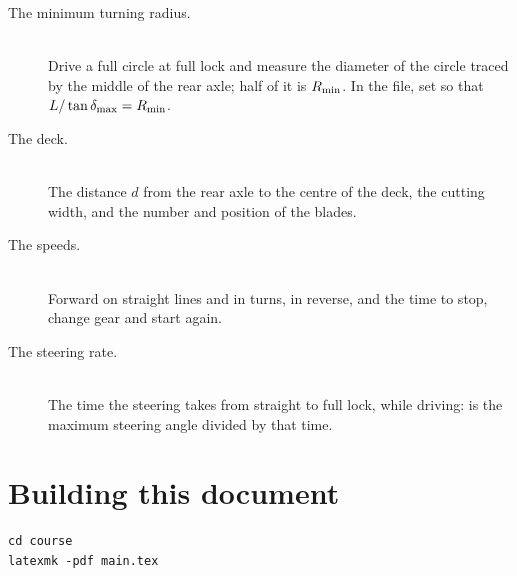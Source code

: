 \begin{description}
  \item[The minimum turning radius.]
    \leavevmode\\
    Drive a full circle at full lock and measure the diameter of the circle
    traced by the middle of the rear axle; half of it is $R_{\min}$. In the file,
    set  so that $L/\tan\delta_{\max} = R_{\min}$.
  \item[The deck.]
    \leavevmode\\
    The distance $d$ from the rear axle to the centre of the deck, the
    cutting width, and the number and position of the blades.
  \item[The speeds.]
    \leavevmode\\
    Forward on straight lines and in turns, in reverse, and the time to stop,
    change gear and start again.
  \item[The steering rate.]
    \leavevmode\\
    The time the steering takes from straight to full lock, while driving:
     is the maximum steering angle divided by
    that time.
\end{description}

\section{Building this document}

\begin{verbatim}
cd course
latexmk -pdf main.tex
\end{verbatim}

